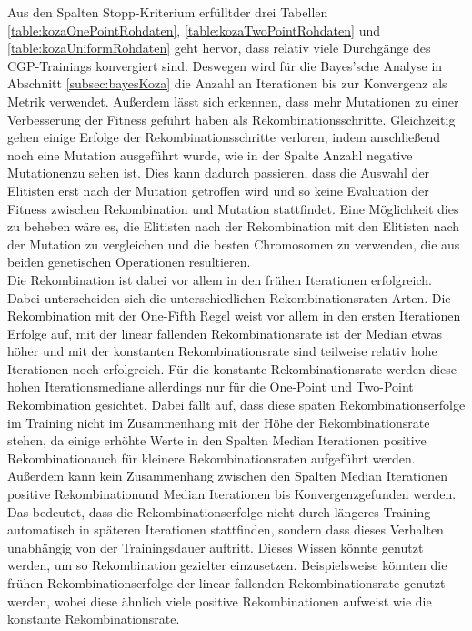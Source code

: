 Aus den Spalten \glqq Stopp-Kriterium erfüllt\grqq\space der drei Tabellen \ref{table:kozaOnePointRohdaten}, \ref{table:kozaTwoPointRohdaten} und \ref{table:kozaUniformRohdaten} geht hervor, dass relativ viele Durchgänge des CGP-Trainings konvergiert sind.
Deswegen wird für die Bayes'sche Analyse in Abschnitt \ref{subsec:bayesKoza} die Anzahl an Iterationen bis zur Konvergenz als Metrik verwendet.
Außerdem lässt sich erkennen, dass mehr Mutationen zu einer Verbesserung der Fitness geführt haben als Rekombinationsschritte.
Gleichzeitig gehen einige Erfolge der Rekombinationsschritte verloren, indem anschließend noch eine Mutation ausgeführt wurde, wie in der Spalte \glqq Anzahl negative Mutationen\grqq\space zu sehen ist.
Dies kann dadurch passieren, dass die Auswahl der Elitisten erst nach der Mutation getroffen wird und so keine Evaluation der Fitness zwischen Rekombination und Mutation stattfindet.
Eine Möglichkeit dies zu beheben wäre es, die Elitisten nach der Rekombination mit den Elitisten nach der Mutation zu vergleichen und die besten Chromosomen zu verwenden, die aus beiden genetischen Operationen resultieren.\\
Die Rekombination ist dabei vor allem in den frühen Iterationen erfolgreich.
Dabei unterscheiden sich die unterschiedlichen Rekombinationsraten-Arten.
Die Rekombination mit der One-Fifth Regel weist vor allem in den ersten Iterationen Erfolge auf, mit der linear fallenden Rekombinationsrate ist der Median etwas höher und mit der konstanten Rekombinationsrate sind teilweise relativ hohe Iterationen noch erfolgreich.
Für die konstante Rekombinationsrate werden diese hohen Iterationsmediane allerdings nur für die One-Point und Two-Point Rekombination gesichtet.
Dabei fällt auf, dass diese späten Rekombinationserfolge im Training nicht im Zusammenhang mit der Höhe der Rekombinationsrate stehen, da einige erhöhte Werte in den Spalten \glqq Median Iterationen positive Rekombination\grqq\space auch für kleinere Rekombinationsraten aufgeführt werden.
Außerdem kann kein Zusammenhang zwischen den Spalten \glqq Median Iterationen positive Rekombination\grqq\space und \glqq Median Iterationen bis Konvergenz\grqq\space gefunden werden.
Das bedeutet, dass die Rekombinationserfolge nicht durch längeres Training automatisch in späteren Iterationen stattfinden, sondern dass dieses Verhalten unabhängig von der Trainingsdauer auftritt.
Dieses Wissen könnte genutzt werden, um so Rekombination gezielter einzusetzen.
Beispielsweise könnten die frühen Rekombinationserfolge der linear fallenden Rekombinationsrate genutzt werden, wobei diese ähnlich viele positive Rekombinationen aufweist wie die konstante Rekombinationsrate.
